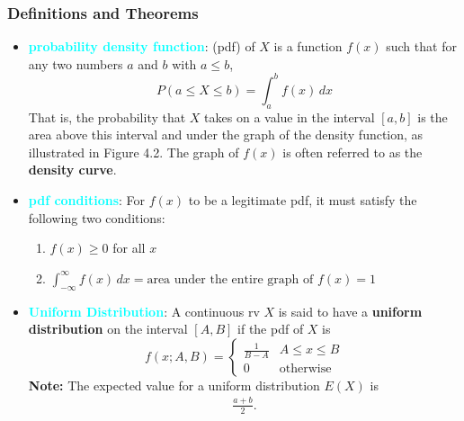 \documentclass{report}
\begin{document}
    \subsubsection{Definitions and Theorems}
    \begin{itemize}
        \item \textbf{\textcolor{cyan}{probability density function}}: (pdf) of $X$ is a function $f(x)$ such that for any two numbers $a$ and $b$ with $a \leq b$,
            \[
                P(a \leq X \leq b) = \int_{a}^{b} f(x) \, dx
            \]
            That is, the probability that $X$ takes on a value in the interval $[a, b]$ is the area above this interval and under the graph of the density function, as illustrated in Figure 4.2. The graph of $f(x)$ is often referred to as the \textbf{density curve}. 
        \item \textbf{\textcolor{cyan}{pdf conditions}}:
            For $f(x)$ to be a legitimate pdf, it must satisfy the following two conditions:
            \begin{enumerate}
                \item $f(x) \geq 0$ for all $x$
                \item $\int_{-\infty}^{\infty} f(x) \, dx = \text{area under the entire graph of } f(x) = 1$
            \end{enumerate}
        \item \textbf{\textcolor{cyan}{Uniform Distribution}}:
            A continuous rv $X$ is said to have a \textbf{uniform distribution} on the interval $[A, B]$ if the pdf of $X$ is
            \[
                f(x; A, B) = 
                \begin{cases} 
                    \frac{1}{B - A} & A \leq x \leq B \\ 
                    0 & \text{otherwise} 
                \end{cases}
            \]
            \bigbreak \noindent 
            \textbf{Note:} The expected value for a uniform distribution $E(X)$ is 
            \begin{align*}
                \frac{a+b}{2}
            .\end{align*}


\end{itemize}
\end{document}
